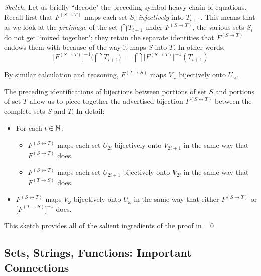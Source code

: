 \begin{proof}[Sketch]
\smallskip

Let us briefly ``decode" the preceding symbol-heavy chain of equations.  Recall first that $F^{(S \rightarrow T)}$ maps each set $S_i$ {\em injectively} into $T_{i+1}$.  This means that as we look at the {\it preimage} of the set $\bigcap T_{i+1}$ under $F^{(S \rightarrow T)}$, the various sets $S_i$ do not get ``mixed together"; they retain the separate identities that $F^{(S \rightarrow T)}$ endows them with because of the way it maps $S$ into $T$.  In other words,
\[ \Big[F^{(S \rightarrow T)}\Big]^{-1} \Big(\bigcap T_{i+1} \Big) \ = \
\bigcap \Big[F^{(S \rightarrow T)}\Big]^{-1} (T_{i+1}) \]


\smallskip

\noindent
By similar calculation and reasoning, $F^{(T \rightarrow S)}$ maps $V_\omega$ bijectively onto $U_\omega$.

\medskip

The preceding identifications of bijections between portions of set $S$ and portions of set $T$ allow us to piece together the advertised bijection $F^{(S \leftrightarrow T)}$ between the complete sets $S$ and $T$.  In detail:
\begin{itemize}
\item
For each $i \in \mathbb{N}$:
  \begin{itemize}
  \item
$F^{(S \leftrightarrow T)}$ maps each set $U_{2i}$ bijectively onto $V_{2i+1}$ in the same way that $F^{(S \rightarrow T)}$ does.
  \medskip\item
$F^{(S \leftrightarrow T)}$ maps each set $U_{2i+1}$ bijectively onto $V_{2i}$ in the same way that $F^{(T \rightarrow S)}$ does.
\end{itemize}

\medskip\item
$F^{(S \leftrightarrow T)}$ maps $V_\omega$ bijectively onto $U_\omega$ in the same way that either $F^{(S \rightarrow T)}$ or $\Big[F^{(T \rightarrow S)}\Big]^{-1}$ does.
\end{itemize}
This sketch provides all of the salient ingredients of the proof in \cite{Tonien07}.  \qed
\end{proof}

\subsection{Sets, Strings, Functions: Important Connections}
\label{sec:sets-strings-functions}

